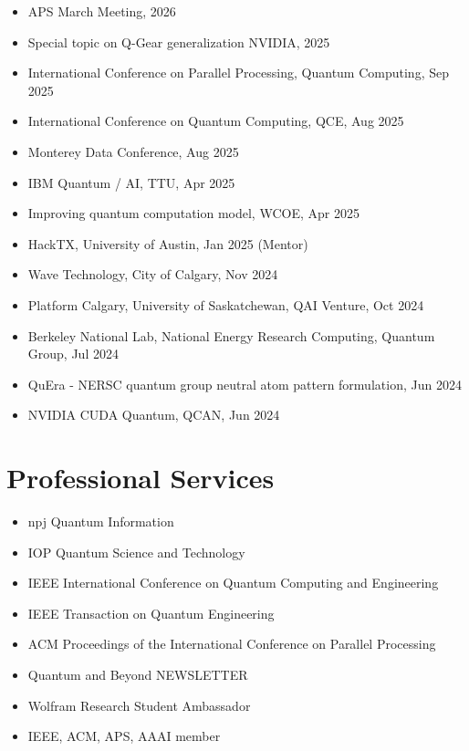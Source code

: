 \documentclass[10pt, letterpaper]{article}
\newenvironment{plainlines}{%
    \begin{itemize}[label={}, leftmargin=0pt, topsep=0.10cm, itemsep=0pt,
                    parsep=0pt, partopsep=0pt]
}{%
    \end{itemize}%
}
\begin{document}
\begin{plainlines}
\item APS March Meeting, 2026
\item Special topic on Q-Gear generalization NVIDIA, 2025
\item International Conference on Parallel Processing, Quantum Computing, Sep 2025
\item International Conference on Quantum Computing, QCE, Aug 2025
\item Monterey Data Conference, Aug 2025
\item IBM Quantum / AI, TTU, Apr 2025
\item Improving quantum computation model, WCOE, Apr 2025
\item HackTX, University of Austin, Jan 2025 (Mentor)
\item Wave Technology, City of Calgary, Nov 2024
\item Platform Calgary, University of Saskatchewan, QAI Venture, Oct 2024
\item Berkeley National Lab, National Energy Research Computing, Quantum Group, Jul 2024
\item QuEra - NERSC quantum group neutral atom pattern formulation, Jun 2024
\item NVIDIA CUDA Quantum, QCAN, Jun 2024
\end{plainlines}

\section{Professional Services}

\begin{plainlines}
\item npj Quantum Information
\item IOP Quantum Science and Technology
\item IEEE International Conference on Quantum Computing and Engineering
\item IEEE Transaction on Quantum Engineering
\item ACM Proceedings of the International Conference on Parallel Processing
\item Quantum and Beyond NEWSLETTER
\item Wolfram Research Student Ambassador
\item IEEE, ACM, APS, AAAI member
\end{plainlines}
\end{document}
